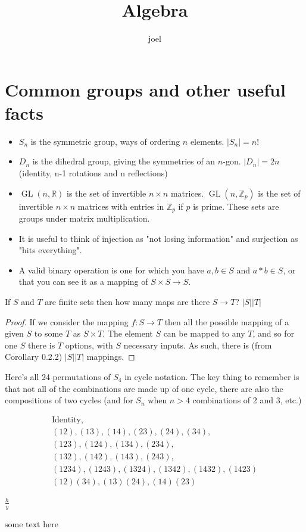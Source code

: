 \documentclass{article}
\title{Algebra}
\author{joel}
\date{}
\theoremstyle{definition}
\theoremstyle{remark}
\newcommand{\R}{\mathbb{R}}
\newcommand{\Z}{\mathbb{Z}}
\DeclareMathOperator{\GL}{GL}
\begin{document}
\maketitle

\section*{Common groups and other useful facts} 

\begin{itemize}

    \item $S_n$ is the symmetric group, ways of ordering $n$ elements. $|S_n| =n!$

    \item $D_n$ is the dihedral group, giving the symmetries of an $n$-gon. 
        $|D_n| = 2n$ (identity, n-1 rotations and n reflections)

    \item $\GL(n, \R)$ is the set of invertible $n \times n$ matrices. $\GL(n,
        \Z_p)$ is the set of invertible $n \times n$ matrices with entries in
        $\Z_p$ if $p$ is prime. These sets are groups under matrix
        multiplication. 

    \item It is useful to think of injection as "not losing information" and
        surjection as "hits everything". 

    \item A valid binary operation is one for which you have $a, b \in S$ and 
        $a * b \in S$, or that you can see it as a mapping of $S \times S \to S$.


\end{itemize}

If $S$  and $T$  are finite sets then how many maps are there $S \to T$?
$|S||T|$

\begin{proof} 
    If we consider the mapping $f: S \to T$ then all the possible mapping of a
    given $S$ to some $T$ as $S \times T$. The element $S$ can be mapped to any
    $T$, and so for one $S$ there is $T$ options, with $S$ necessary inputs. As
    such, there is (from Corollary 0.2.2) $|S||T|$ mappings. 
\end{proof} 

Here's all 24 permutations of $S_4$ in cycle notation. The key thing to
remember is that not all of the combinations are made up of one cycle, there
are also the compositions of two cycles (and for $S_n$ when $n>4$ combinations
of 2 and 3, etc.)

\begin{gather*}
    \text{Identity}, \\
    (1 2), (1 3), (1 4), (2 3), (2 4), (3 4), \\
    (1 2 3), (1 2 4), (1 3 4), (2 3 4), \\
    (1 3 2), (1 4 2), (1 4 3), (2 4 3), \\
    (1 2 3 4), (1 2 4 3), (1 3 2 4), (1 3 4 2), (1 4 3 2), (1 4 2 3) \\
    (1 2)(3 4), (1 3)(2 4), (1 4)(2 3)
\end{gather*}

$\frac{h}{y}$

$ \text{some text here} $
\end{document}
